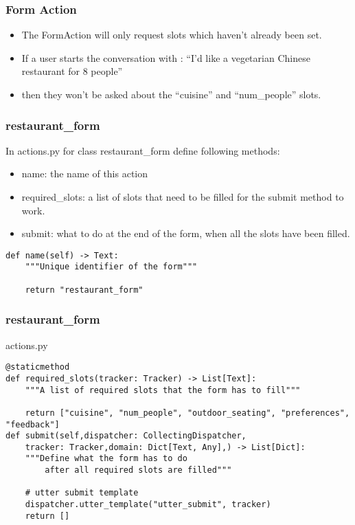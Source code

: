  \begin{frame}[fragile]\frametitle{Form Action}
\begin{itemize}
\item The FormAction will only request slots which haven’t already been set. 
\item If a user starts the conversation with : ``I’d like a vegetarian Chinese restaurant for 8 people''
\item then they won’t be asked about the ``cuisine'' and ``num\_people'' slots.
\end{itemize}
\end{frame}

 \begin{frame}[fragile]\frametitle{restaurant\_form}
In actions.py for class restaurant\_form define following methods:
\begin{itemize}
\item name: the name of this action
\item required\_slots: a list of slots that need to be filled for the submit method to work.
\item submit: what to do at the end of the form, when all the slots have been filled.
\end{itemize}
\begin{lstlisting}
def name(self) -> Text:
    """Unique identifier of the form"""

    return "restaurant_form"
\end{lstlisting}
\end{frame}

 \begin{frame}[fragile]\frametitle{restaurant\_form}
actions.py
\begin{lstlisting}
@staticmethod
def required_slots(tracker: Tracker) -> List[Text]:
    """A list of required slots that the form has to fill"""

    return ["cuisine", "num_people", "outdoor_seating", "preferences", "feedback"]
def submit(self,dispatcher: CollectingDispatcher,
    tracker: Tracker,domain: Dict[Text, Any],) -> List[Dict]:
    """Define what the form has to do
        after all required slots are filled"""

    # utter submit template
    dispatcher.utter_template("utter_submit", tracker)
    return []
\end{lstlisting}
\end{frame}

